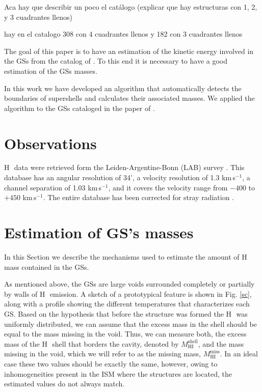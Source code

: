 \documentclass{aa}
\newcommand{\hi}{\mbox{H\,\sc{i}}}
\newcommand{\kms}{km\,s$^{-1}$}
\begin{document}
Aca hay que describir un poco el catálogo (explicar que hay estructuras con 1, 2, y 3 cuadrantes llenos)

hay en el catalogo 308 con 4 cuadrantes llenos y 182 con 3 cuadrantes llenos

The goal of this paper is to have an estimation of the kinetic energy involved in the  GSs from the catalog of \cite{sua14}. To this end it is necessary to have a good estimation of the GSs masses. 

In this work we  have developed an algorithm that automatically detects the boundaries of supershells and calculates their associated masses. We applied the algorithm to the GSs cataloged in the paper of \cite{sua14}.

\section{Observations}

\hi\, data were retrieved form the Leiden-Argentine-Bonn (LAB) survey \citep{kal05}. This database has an angular resolution of 34', a velocity resolution of  1.3 \kms,  a channel separation of 1.03 \kms, and it covers the velocity range from $-400$ to $+450$ \kms. The entire database has been corrected for stray radiation \citep{kal05}.

  
\section{Estimation of GS's masses}

In this Section we describe the mechanisms used to estimate the amount of \hi\, mass contained in the GSs. 

As mentioned above, the GSs are  large voids  surrounded completely or partially by walls of \hi\, emission. A sketch of a prototypical feature is shown in Fig. \ref{sc}, along with a profile showing the different temperatures that characterizes each GS. Based on the hypothesis that before the structure was formed the \hi\, was uniformly distributed, we can assume that the excess mass in the shell should be equal to the mass missing in the void. 
Thus, we  can measure both, the excess mass of the \hi\, shell that borders the cavity, denoted by  $M_{\mathrm{HI}}^{\mathrm{shell}}$, and  the mass missing in the void, which we will refer to as the missing mass, $M_{\mathrm{HI}}^{\mathrm{miss}}$.
In an ideal case these two values should be exactly the same, however,
owing to  inhomogeneities present in the ISM where the structures are located, the estimated values do not always match. 
\end{document}

